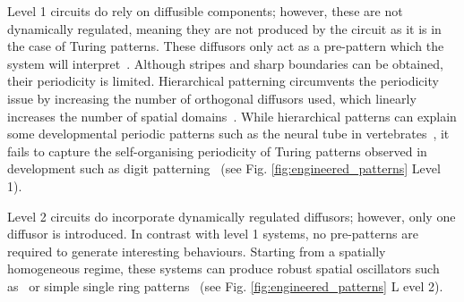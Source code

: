 Level 1 circuits do rely on diffusible components; however, these are not dynamically regulated, meaning they are not produced by the circuit as it is in the case of Turing patterns.
These diffusors only act as a pre-pattern which the system will interpret~\parencite{Basu2005, Schaerli2014, Kong2017, Barbier2020, Grant2020}.
Although stripes and sharp boundaries can be obtained, their periodicity is limited.
Hierarchical patterning circumvents the periodicity issue by increasing the number of orthogonal diffusors used, which linearly increases the number of spatial domains~\parencite{Boehm2018}.
While hierarchical patterns can explain some developmental periodic patterns such as the neural tube in vertebrates~\parencite{Briscoe2015}, it fails to capture the self-organising periodicity of Turing patterns observed in development such as digit patterning~\parencite{Sheth2012,Raspopovic1} (see Fig. \ref{fig:engineered_patterns} Level 1).

Level 2 circuits do incorporate dynamically regulated diffusors; however, only one diffusor is introduced.
In contrast with level 1 systems, no pre-patterns are required to generate interesting behaviours.
Starting from a spatially homogeneous regime, these systems can produce robust spatial oscillators such as~\parencite{Danino2010} or simple single ring patterns~\parencite{Cao2016, Payne2013} (see Fig. \ref{fig:engineered_patterns} L evel 2).

